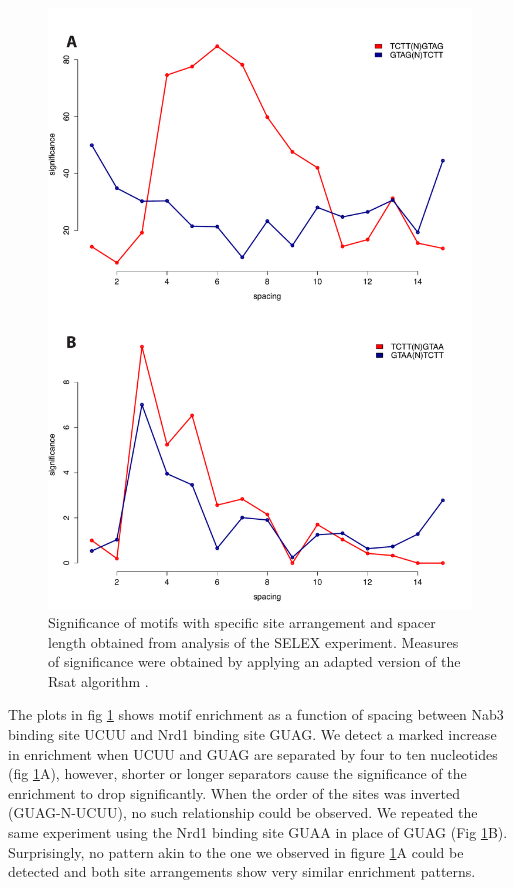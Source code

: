 \begin{figure}[hp!]

\centering
\includegraphics[width=\textwidth]{figures/results/positionalVitro}
\caption[Enrichment of Nrd1 and Nab3 sites with different arrangements and spacings in the SELEX experiment]{Significance of motifs with specific site arrangement and spacer length obtained from analysis of the SELEX experiment. Measures of significance were obtained by applying an adapted version of the Rsat algorithm \cite[see methods]{vanhelden:1998:extracting}.}
\label{fig:positionalVitro}

\end{figure} 

The plots in fig \ref{fig:positionalVitro} shows motif enrichment as a function of spacing between Nab3 binding site UCUU and Nrd1 binding site GUAG.  We detect a marked increase in enrichment when UCUU and GUAG are separated by four to ten nucleotides (fig \ref{fig:positionalVitro}A), however, shorter or longer separators cause the significance of the enrichment to drop significantly. When the order of the sites was inverted (GUAG-N-UCUU), no such relationship could be observed. We repeated the same experiment using the Nrd1 binding site GUAA in place of GUAG (Fig \ref{fig:positionalVitro}B). Surprisingly, no pattern akin to the one we observed in figure \ref{fig:positionalVitro}A could be detected and both site arrangements show very similar enrichment patterns.

